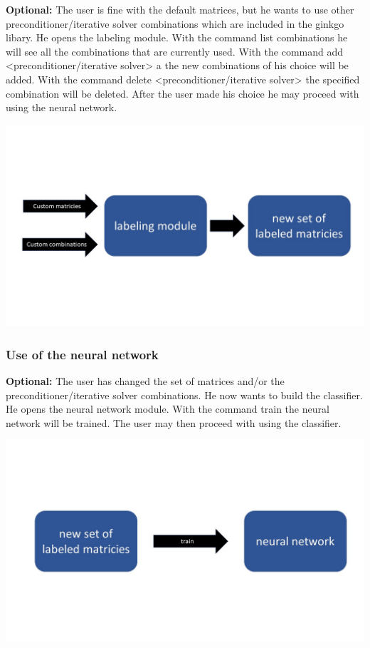 \documentclass[parskip=full]{scrartcl}
\begin{document}
\textbf{Optional:} The user is fine with the default matrices, but he wants to use other preconditioner/iterative solver combinations which are included in the ginkgo libary. He opens the labeling module. With the command list combinations he will see all the combinations that are currently used. With the command add <preconditioner/iterative solver> a the new combinations of his choice will be added. With the command delete <preconditioner/iterative solver> the specified combination will be deleted. After the user made his choice he may proceed with using the neural network.
\begin{center}
\includegraphics[width=\textwidth]{labelingModule}
\end{center}


\subsubsection{Use of the neural network}
\textbf{Optional:} The user has changed the set of matrices and/or the preconditioner/iterative solver combinations. He now wants to build the classifier. He opens the neural network module. With the command train the neural network will be trained. The user may then proceed with using the classifier.

\begin{center}
\includegraphics[width=\textwidth]{neuralNetwork}
\end{center}
\end{document}
